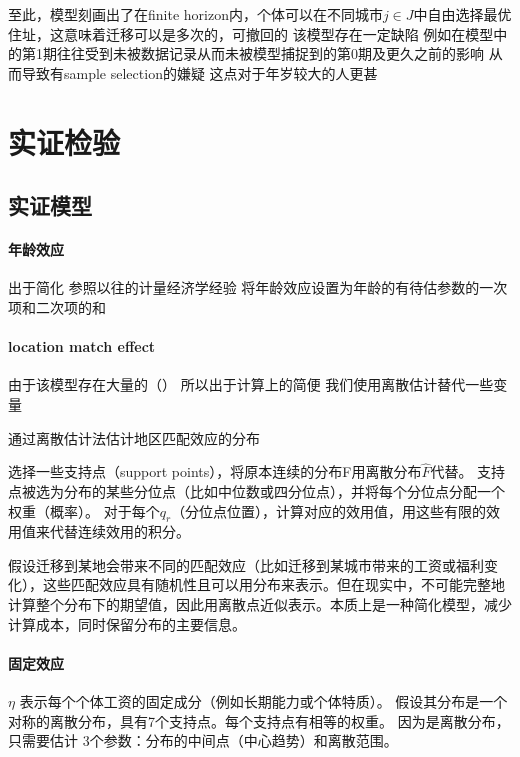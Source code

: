 \documentclass[a4paper,12pt,oneside]{book} %
\begin{document}
至此，模型刻画出了在finite horizon内，个体可以在不同城市$j\in J$中自由选择最优住址，这意味着迁移可以是多次的，可撤回的
该模型存在一定缺陷
例如在模型中的第1期往往受到未被数据记录从而未被模型捕捉到的第0期及更久之前的影响
从而导致有sample selection的嫌疑
这点对于年岁较大的人更甚

\chapter{实证检验}

\section{实证模型} %
\label{sub:实证模型}
\subsubsection{年龄效应}
出于简化
参照以往的计量经济学经验
将年龄效应设置为年龄的有待估参数的一次项和二次项的和

\subsubsection{location match effect}
由于该模型存在大量的（）
所以出于计算上的简便
我们使用离散估计替代一些变量

通过离散估计法估计地区匹配效应的分布

选择一些支持点（support points），将原本连续的分布F用离散分布$\hat F$代替。
支持点被选为分布的某些分位点（比如中位数或四分位点），并将每个分位点分配一个权重（概率）。
对于每个$q_r$（分位点位置），计算对应的效用值，用这些有限的效用值来代替连续效用的积分。

假设迁移到某地会带来不同的匹配效应（比如迁移到某城市带来的工资或福利变化），这些匹配效应具有随机性且可以用分布来表示。但在现实中，不可能完整地计算整个分布下的期望值，因此用离散点近似表示。本质上是一种简化模型，减少计算成本，同时保留分布的主要信息。

\subsubsection{固定效应}


$\eta$ 表示每个个体工资的固定成分（例如长期能力或个体特质）。
假设其分布是一个对称的离散分布，具有7个支持点。每个支持点有相等的权重。
因为是离散分布，只需要估计 3个参数：分布的中间点（中心趋势）和离散范围。
\end{document}
